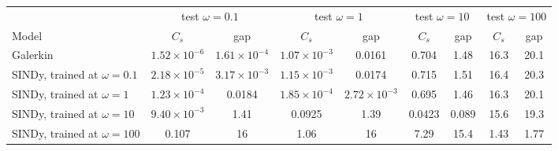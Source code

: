 \begin{tabular}{l|cc|cc|cc|cc}\toprule
 & \multicolumn{2}{c|}{test $\omega=0.1$} & \multicolumn{2}{c|}{test $\omega=1$} & \multicolumn{2}{c|}{test $\omega=10$} & \multicolumn{2}{c}{test $\omega=100$}\\
Model & $C_s$ & gap & $C_s$ & gap & $C_s$ & gap & $C_s$ & gap\\\midrule
Galerkin & $1.52\!\times\!10^{-6}$ & $1.61\!\times\!10^{-4}$ & $1.07\!\times\!10^{-3}$ & 0.0161 & 0.704 & 1.48 & 16.3 & 20.1\\
SINDy, trained at $\omega = 0.1$ & $2.18\!\times\!10^{-5}$ & $3.17\!\times\!10^{-3}$ & $1.15\!\times\!10^{-3}$ & 0.0174 & 0.715 & 1.51 & 16.4 & 20.3\\
SINDy, trained at $\omega = 1$ & $1.23\!\times\!10^{-4}$ & 0.0184 & $1.85\!\times\!10^{-4}$ & $2.72\!\times\!10^{-3}$ & 0.695 & 1.46 & 16.3 & 20.1\\
SINDy, trained at $\omega = 10$ & $9.40\!\times\!10^{-3}$ & 1.41 & 0.0925 & 1.39 & 0.0423 & 0.089 & 15.6 & 19.3\\
SINDy, trained at $\omega = 100$ & 0.107 & 16 & 1.06 & 16 & 7.29 & 15.4 & 1.43 & 1.77\\
\bottomrule\end{tabular}